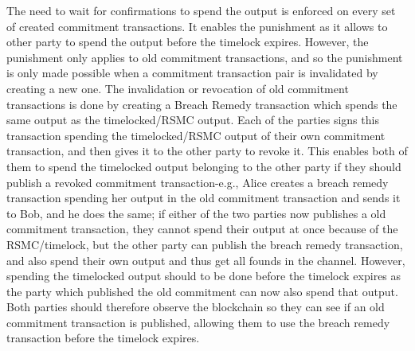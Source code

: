 The need to wait for confirmations to spend the output is enforced on every set of created commitment transactions. It enables the punishment as it allows to other party to spend the output before the timelock expires. However, the punishment only applies to old commitment transactions, and so the punishment is only made possible when a commitment transaction pair is invalidated by creating a new one. The invalidation or revocation of old commitment transactions is done by creating a Breach Remedy transaction which spends the same output as the timelocked/RSMC output. Each of the parties signs this transaction spending the timelocked/RSMC output of their own commitment transaction, and then gives it to the other party to revoke it. This enables both of them to spend the timelocked output belonging to the other party if they should publish a revoked commitment transaction-e.g., Alice creates a breach remedy transaction spending her output in the old commitment transaction and sends it to Bob, and he does the same; if either of the two parties now publishes a old commitment transaction, they cannot spend their output at once because of the RSMC/timelock, but the other party can publish the breach remedy transaction, and also spend their own output and thus get all founds in the channel. However, spending the timelocked output should to be done before the timelock expires as the party which published the old commitment can now also spend that output. Both parties should therefore observe the blockchain so they can see if an old commitment transaction is published, allowing them to use the breach remedy transaction before the timelock expires.
\\

